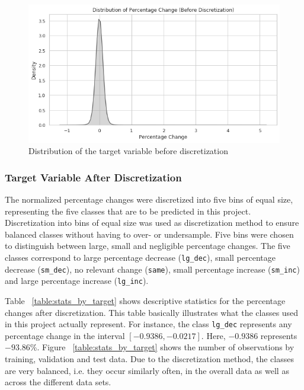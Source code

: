 \documentclass{article}
\begin{document}
	
	\begin{figure}[h!]
		\includegraphics[width=\linewidth]{img/dist_target_nondisc.png}
		\caption{Distribution of the target variable before discretization}
		\label{fig:dist_target_nondisc}
	\end{figure}

	\subsubsection{Target Variable After Discretization}
		
	The normalized percentage changes were discretized into five bins of equal size, representing the five classes that are to be predicted in this project. Discretization into bins of equal size was used as discretization method to ensure balanced classes without having to over- or undersample. Five bins were chosen to distinguish between large, small and negligible percentage changes. The five classes correspond to large percentage decrease (\lstinline{lg_dec}), small percentage decrease (\lstinline{sm_dec}), no relevant change (\lstinline{same}), small percentage increase (\lstinline{sm_inc}) and large percentage increase (\lstinline{lg_inc}).
	
	Table ~\ref{table:stats_by_target} shows descriptive statistics for the percentage changes after discretization. This table basically illustrates what the classes used in this project actually represent. For instance, the class  \lstinline{lg_dec} represents any percentage change in the interval $[-0.9386, -0.0217]$. Here, $-0.9386$ represents $-93.86$\%. Figure ~\ref{table:stats_by_target} shows the number of observations by training, validation and test data. Due to the discretization method, the classes are very balanced, i.e. they occur similarly often, in the overall data as well as across the different data sets.
	
\end{document}
